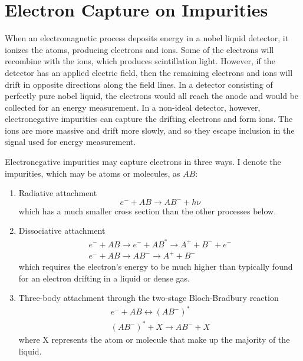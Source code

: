 \documentclass[herrin-thesis.tex]{subfiles}
\begin{document}
\section{Electron Capture on Impurities}
When an electromagnetic process deposits energy in a nobel liquid detector, it ionizes the atoms, producing electrons and ions. Some of the electrons will recombine with the ions, which produces scintillation light. However, if the detector has an applied electric field, then the remaining electrons and ions will drift in opposite directions along the field lines. In a detector consisting of perfectly pure nobel liquid, the electrons would all reach the anode and would be collected for an energy measurement. In a non-ideal detector, however, electronegative impurities can capture the drifting electrons and form ions. The ions are more massive and drift more slowly, and so they escape inclusion in the signal used for energy measurement.

Electronegative impurities may capture electrons in three ways\cite{Aprile:2006fk}. I denote the impurities, which may be atoms or molecules, as \(AB\):
\begin{enumerate}
\item Radiative attachment
\begin{equation}
e^{-} + AB \rightarrow AB^{-} + h \nu
\end{equation}
which has a much smaller cross section than the other processes below.
\item Dissociative attachment
\begin{equation}
\begin{split}
e^{-} + AB \rightarrow e^{-} + AB^{*} \rightarrow A^{+} + B^{-} + e^{-} \\
e^{-} + AB \rightarrow AB^{-} \rightarrow A^{+} + B^{-}
\end{split}
\end{equation}
which requires the electron's energy to be much higher than typically found for an electron drifting in a liquid or dense gas.
\item Three-body attachment through the two-stage Bloch-Bradbury reaction
\begin{equation}
\begin{split}
e^{-} + AB \leftrightarrow (AB^{-})^{*} \\
(AB^{-})^{*} + X \rightarrow AB^{-} + X
\end{split}
\label{eq:3bodyattachment}
\end{equation}
where X represents the atom or molecule that make up the majority of the liquid.
\end{enumerate}
\end{document}
